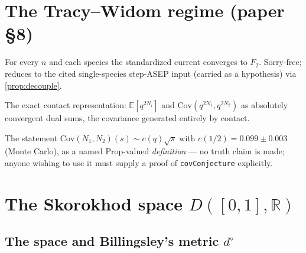 \chapter{The Tracy--Widom regime (paper \S8)}

\begin{theorem}\label{thm:marg}
  \leanok
  For every $n$ and each species the standardized current converges to $F_2$.
  Sorry-free; reduces to the cited single-species step-ASEP input (carried as a
  hypothesis) via \ref{prop:decouple}.
\end{theorem}

\begin{theorem}\label{thm:cov}
  \leanok
  The exact contact representation: $\mathbb E[q^{2N_i}]$ and
  $\mathrm{Cov}(q^{2N_1},q^{2N_2})$ as absolutely convergent dual sums, the
  covariance generated entirely by contact.
\end{theorem}

\begin{definition}\label{conj:cov}
  \leanok
  The statement $\mathrm{Cov}(N_1,N_2)(s) \sim c(q)\sqrt s$ with
  $c(1/2) = 0.099 \pm 0.003$ (Monte Carlo), as a named Prop-valued
  \emph{definition} --- no truth claim is made; anyone wishing to use it must supply
  a proof of \texttt{covConjecture} explicitly.
\end{definition}


\chapter{The Skorokhod space \texorpdfstring{$D([0,1],\mathbb{R})$}{D([0,1],R)}}

\section{The space and Billingsley's metric \texorpdfstring{$d^\circ$}{d-circ}}

